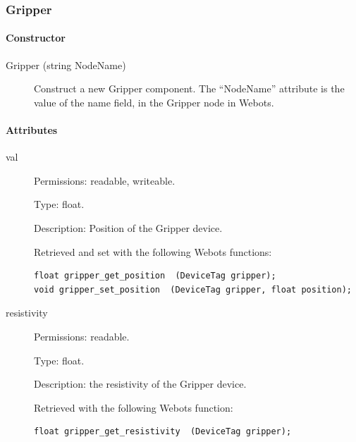 \subsubsection{Gripper}
\label{webots.uobjects.robotdevices.gripper}%

\paragraph{Constructor}
\label{webots.uobjects.robotdevices.gripper.constructor}%

\noindent
\begin{description}
\item[{Gripper (string NodeName)}] Construct a new Gripper component. The ``NodeName'' attribute is the value
          of the name field, in the Gripper node in Webots.

\end{description}

\paragraph{Attributes}
\label{webots.uobjects.robotdevices.gripper.attributes}%

\noindent
\begin{description}
\item[{         val
 }]            Permissions: readable, writeable.


 Type: float.


 Description: Position of the Gripper device.


 Retrieved and set with the following Webots functions:


\begin{lstlisting}
float gripper_get_position  (DeviceTag gripper);
void gripper_set_position  (DeviceTag gripper, float position);
\end{lstlisting}
\item[{         resistivity
 }]            Permissions: readable.


 Type: float.


 Description: the resistivity of the Gripper device.


 Retrieved with the following Webots function:


\begin{lstlisting}
float gripper_get_resistivity  (DeviceTag gripper);
\end{lstlisting}
\end{description}

